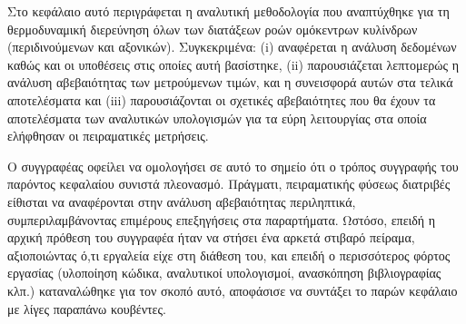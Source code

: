 



\noindent Στο κεφάλαιο αυτό περιγράφεται η αναλυτική μεθοδολογία που αναπτύχθηκε για τη θερμοδυναμική διερεύνηση όλων των διατάξεων ροών ομόκεντρων κυλίνδρων (περιδινούμενων και αξονικών). Συγκεκριμένα: (i) αναφέρεται η ανάλυση δεδομένων καθώς και οι υποθέσεις στις οποίες αυτή βασίστηκε, (ii) παρουσιάζεται λεπτομερώς η ανάλυση αβεβαιότητας των μετρούμενων τιμών, και η συνεισφορά αυτών στα τελικά αποτελέσματα και (iii) παρουσιάζονται οι σχετικές αβεβαιότητες που θα έχουν τα αποτελέσματα των αναλυτικών υπολογισμών για τα εύρη λειτουργίας στα οποία ελήφθησαν οι πειραματικές μετρήσεις.

Ο συγγραφέας οφείλει να ομολογήσει σε αυτό το σημείο ότι ο τρόπος συγγραφής του παρόντος κεφαλαίου συνιστά πλεονασμό. Πράγματι, πειραματικής φύσεως διατριβές \parencites{2015_Μηλιδόνης_DISSERTATION}{2020_Δόγκας_DISSERTATION} είθισται να αναφέρονται στην ανάλυση αβεβαιότητας περιληπτικά, συμπεριλαμβάνοντας επιμέρους επεξηγήσεις στα παραρτήματα. Ωστόσο, επειδή η αρχική πρόθεση του συγγραφέα ήταν να στήσει ένα αρκετά στιβαρό πείραμα, αξιοποιώντας ό,τι εργαλεία είχε στη διάθεση του, και επειδή ο περισσότερος φόρτος εργασίας (υλοποίηση κώδικα, αναλυτικοί υπολογισμοί, ανασκόπηση βιβλιογραφίας κλπ.) καταναλώθηκε για τον σκοπό αυτό, αποφάσισε να συντάξει το παρών κεφάλαιο με λίγες παραπάνω κουβέντες.


